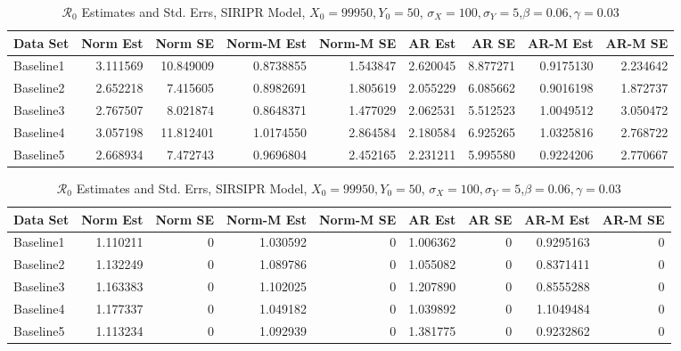 \documentclass[12pt]{article}
\newcommand{\rr}{\ensuremath{\mathcal{R}_0}}
\begin{document}
\begin{table}[H]
	
	\caption{\label{tab:}$\rr$ Estimates and Std. Errs, SIRIPR Model,
		$X_0 = 99950, Y_0 = 50$, $\sigma_X = 100, \sigma_Y = 5$,$\beta = 0.06, \gamma = 0.03$}
	\centering
	\begin{footnotesize}
	\begin{tabular}[t]{l|r|r|r|r|r|r|r|r}
		\hline
		Data Set & Norm Est & Norm SE & Norm-M Est & Norm-M SE & AR Est & AR SE & AR-M Est & AR-M SE\\
		\hline
		Baseline1 & 3.111569 & 10.849009 & 0.8738855 & 1.543847 & 2.620045 & 8.877271 & 0.9175130 & 2.234642\\
		\hline
		Baseline2 & 2.652218 & 7.415605 & 0.8982691 & 1.805619 & 2.055229 & 6.085662 & 0.9016198 & 1.872737\\
		\hline
		Baseline3 & 2.767507 & 8.021874 & 0.8648371 & 1.477029 & 2.062531 & 5.512523 & 1.0049512 & 3.050472\\
		\hline
		Baseline4 & 3.057198 & 11.812401 & 1.0174550 & 2.864584 & 2.180584 & 6.925265 & 1.0325816 & 2.768722\\
		\hline
		Baseline5 & 2.668934 & 7.472743 & 0.9696804 & 2.452165 & 2.231211 & 5.995580 & 0.9224206 & 2.770667\\
		\hline
	\end{tabular}
\end{footnotesize}
\end{table}
\begin{table}[H]
	
	\caption{\label{tab:}$\rr$ Estimates and Std. Errs, SIRSIPR Model,
		$X_0 = 99950, Y_0 = 50$, $\sigma_X = 100, \sigma_Y = 5$,$\beta = 0.06, \gamma = 0.03$}
	\centering
	\begin{footnotesize}
	\begin{tabular}[t]{l|r|r|r|r|r|r|r|r}
		\hline
		Data Set & Norm Est & Norm SE & Norm-M Est & Norm-M SE & AR Est & AR SE & AR-M Est & AR-M SE\\
		\hline
		Baseline1 & 1.110211 & 0 & 1.030592 & 0 & 1.006362 & 0 & 0.9295163 & 0\\
		\hline
		Baseline2 & 1.132249 & 0 & 1.089786 & 0 & 1.055082 & 0 & 0.8371411 & 0\\
		\hline
		Baseline3 & 1.163383 & 0 & 1.102025 & 0 & 1.207890 & 0 & 0.8555288 & 0\\
		\hline
		Baseline4 & 1.177337 & 0 & 1.049182 & 0 & 1.039892 & 0 & 1.1049484 & 0\\
		\hline
		Baseline5 & 1.113234 & 0 & 1.092939 & 0 & 1.381775 & 0 & 0.9232862 & 0\\
		\hline
	\end{tabular}
\end{footnotesize}
\end{table}
\end{document}
